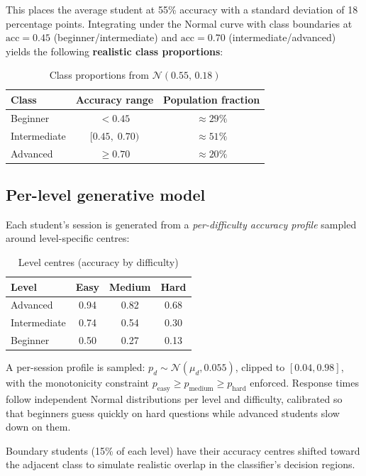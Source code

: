 \documentclass[12pt,a4paper]{article}
\begin{document}
This places the average student at 55\% accuracy with a standard deviation of 18
percentage points. Integrating under the Normal curve with class boundaries at
$\text{acc} = 0.45$ (beginner/intermediate) and $\text{acc} = 0.70$
(intermediate/advanced) yields the following \textbf{realistic class proportions}:

\begin{table}[H]
\centering
\caption{Class proportions from $\mathcal{N}(0.55,\,0.18)$}
\begin{tabular}{@{}lcc@{}}
\toprule
Class & Accuracy range & Population fraction \\
\midrule
Beginner     & $< 0.45$          & $\approx 29\%$ \\
Intermediate & $[0.45,\;0.70)$   & $\approx 51\%$ \\
Advanced     & $\geq 0.70$       & $\approx 20\%$ \\
\bottomrule
\end{tabular}
\end{table}

\subsection{Per-level generative model}

Each student's session is generated from a \emph{per-difficulty accuracy profile}
sampled around level-specific centres:

\begin{table}[H]
\centering
\caption{Level centres (accuracy by difficulty)}
\begin{tabular}{@{}lccc@{}}
\toprule
Level & Easy & Medium & Hard \\
\midrule
Advanced     & 0.94 & 0.82 & 0.68 \\
Intermediate & 0.74 & 0.54 & 0.30 \\
Beginner     & 0.50 & 0.27 & 0.13 \\
\bottomrule
\end{tabular}
\end{table}

A per-session profile is sampled: $p_d \sim \mathcal{N}(\mu_d, 0.055)$, clipped to
$[0.04, 0.98]$, with the monotonicity constraint $p_\text{easy} \geq p_\text{medium}
\geq p_\text{hard}$ enforced. Response times follow independent Normal distributions
per level and difficulty, calibrated so that beginners guess quickly on hard questions
while advanced students slow down on them.

Boundary students (15\% of each level) have their accuracy centres shifted toward
the adjacent class to simulate realistic overlap in the classifier's decision regions.
\end{document}
